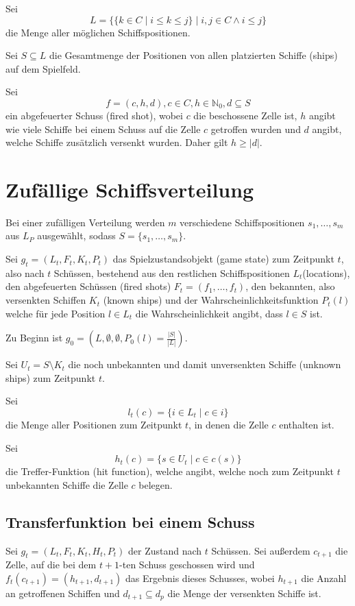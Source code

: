 \documentclass[a4paper,12pt]{llncs}
\newcommand{\N}{{\mathbb{N}}}
\numberwithin{equation}{section}
\begin{document}
Sei 
\[
L=
\{
\{
k
\in
C
\mid
i \leq k \leq j
\}
\mid
i,j \in C
\wedge
i \leq j
\}
\] die Menge aller möglichen Schiffspositionen.

Sei $S \subseteq L$ die Gesamtmenge der Positionen von allen platzierten Schiffe (ships) auf dem Spielfeld.

Sei
\[   
f = (c,h,d), c \in C, h \in \N_0, d \subseteq S
\]
ein abgefeuerter Schuss (fired shot), wobei $c$ die beschossene Zelle ist, $h$ angibt wie viele Schiffe bei einem Schuss auf die Zelle $c$ getroffen wurden und $d$ angibt, welche Schiffe zusätzlich versenkt wurden. Daher gilt $h \geq |d|$.


\section{Zufällige Schiffsverteilung}

Bei einer zufälligen Verteilung werden $m$ verschiedene Schiffspositionen $s_1, \dots, s_m$ aus $L_P$ ausgewählt, sodass $S=\{s_1, \dots, s_m\}$.

Sei $g_t=(L_t, F_t, K_t, P_t)$ das Spielzustandsobjekt (game state) zum Zeitpunkt $t$, also nach $t$ Schüssen, bestehend aus den restlichen Schiffspositionen $L_t$(locations), den abgefeuerten Schüssen (fired shots) $F_t=(f_1, \dots, f_t)$, den bekannten, also versenkten Schiffen $K_t$ (known ships) und der Wahrscheinlichkeitsfunktion $P_t(l)$ welche für jede Position $l \in L_t$ die Wahrscheinlichkeit angibt, dass $l \in S$ ist.

Zu Beginn ist $g_0=(L, \emptyset, \emptyset, P_0(l)=\frac{|S|}{|L|})$.

Sei $U_t=S \setminus K_t$ die noch unbekannten und damit unversenkten Schiffe (unknown ships) zum Zeitpunkt $t$.

Sei
\[
l_t(c)=
\{
i
\in
L_t
\mid
c
\in
i
\}
\]
die Menge aller Positionen zum Zeitpunkt $t$, in denen die Zelle $c$ enthalten ist.


Sei
\[
h_t(c)=
\{
s
\in
U_t
\mid
c
\in
c(s)
\}
\]
die Treffer-Funktion (hit function), welche angibt, welche noch zum Zeitpunkt $t$ unbekannten Schiffe die Zelle $c$ belegen.

\subsection{Transferfunktion bei einem Schuss}
Sei $g_t=(L_t, F_t, K_t, H_t, P_t)$ der Zustand nach $t$ Schüssen.
Sei außerdem $c_{t+1}$ die Zelle, auf die bei dem $t+1$-ten Schuss geschossen wird und $f_t(c_{t+1})=(h_{t+1}, d_{t+1})$ das Ergebnis dieses Schusses, wobei $h_{t+1}$ die Anzahl an getroffenen Schiffen und $d_{t+1} \subseteq d_p$ die Menge der versenkten Schiffe ist.
\end{document}
